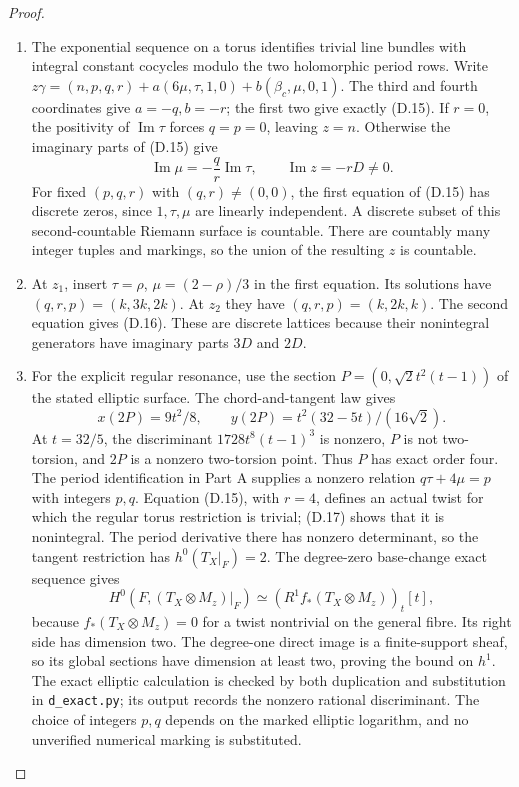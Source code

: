 \begin{proof}
\begin{enumerate}[label=\arabic*.,leftmargin=*]
\item The exponential sequence on a torus identifies trivial line bundles
with integral constant cocycles modulo the two holomorphic period
rows. Write
$z\gamma=(n,p,q,r)+a(6\mu,\tau,1,0)+b(\beta_c,\mu,0,1)$.
The third and fourth coordinates give $a=-q,b=-r$; the first two
give exactly (D.15). If $r=0$, the positivity of $\operatorname{Im}\tau$
forces $q=p=0$, leaving $z=n$. Otherwise the imaginary parts of
(D.15) give
\[
 \operatorname{Im}\mu=-\frac qr\operatorname{Im}\tau,
 \qquad\operatorname{Im}z=-rD\ne0.                    \tag{D.17}
\]
For fixed $(p,q,r)$ with $(q,r)\ne(0,0)$, the first equation of
(D.15) has discrete zeros, since $1,\tau,\mu$ are linearly
independent. A discrete subset of this second-countable Riemann
surface is countable. There are countably many integer tuples and
markings, so the union of the resulting $z$ is countable.

\item At $z_1$, insert $\tau=\rho$, $\mu=(2-\rho)/3$ in the first
equation. Its solutions have $(q,r,p)=(k,3k,2k)$.
At $z_2$ they have $(q,r,p)=(k,2k,k)$.
The second equation gives (D.16). These are discrete lattices because
their nonintegral generators have imaginary parts $3D$ and $2D$.

\item For the explicit regular resonance, use the section
$P=(0,\sqrt2t^2(t-1))$ of the stated elliptic surface. The
chord-and-tangent law gives
\[
 x(2P)=9t^2/8,\qquad
 y(2P)=t^2(32-5t)/(16\sqrt2).
\]
At $t=32/5$, the discriminant
$1728t^8(t-1)^3$ is nonzero, $P$ is not two-torsion, and $2P$ is a
nonzero two-torsion point. Thus $P$ has exact order four. The period
identification in Part A supplies a nonzero relation
$q\tau+4\mu=p$ with integers $p,q$. Equation (D.15), with $r=4$,
defines an actual twist for which the regular torus restriction is
trivial; (D.17) shows that it is nonintegral. The period derivative
there has nonzero determinant, so the tangent restriction has
$h^0(T_X|_F)=2$. The degree-zero base-change exact sequence gives
\[
 H^0(F,(T_X\otimes M_z)|_F)
   \simeq (R^1f_*(T_X\otimes M_z))_t[t],
\]
because $f_*(T_X\otimes M_z)=0$ for a twist nontrivial on the general
fibre. Its right side has dimension two. The degree-one direct image
is a finite-support sheaf, so its global sections have dimension at
least two, proving the bound on $h^1$. The exact elliptic calculation
is checked by both duplication and substitution in
\texttt{d\_exact.py}; its output records the nonzero rational
discriminant. The choice of integers $p,q$ depends on the marked
elliptic logarithm, and no unverified numerical marking is substituted.
\end{enumerate}
\end{proof}

